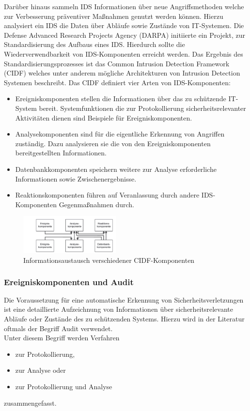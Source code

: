 \documentclass[11pt]{scrartcl}
\begin{document}
Darüber hinaus sammeln IDS Informationen über neue Angriffsmethoden welche zur Verbesserung präventiver Maßnahmen genutzt werden können. Hierzu analysiert ein IDS die Daten über Abläufe sowie Zustände von IT-Systemen. Die Defense Advanced Research Projects Agency (DARPA) initiierte ein Projekt, zur Standardisierung des Aufbaus eines IDS. Hierdurch sollte die Wiederverwendbarkeit von IDS-Komponenten erreicht werden. Das Ergebnis des Standardisierungsprozesses ist das Common Intrusion Detection Framework (CIDF) \cite{7} welches unter anderem mögliche Architekturen von Intrusion Detection Systemen beschreibt. 
Das CIDF definiert vier Arten von IDS-Komponenten:\\
\begin{itemize}
\item Ereigniskomponenten stellen die Informationen über das zu schützende IT-System
bereit. Systemfunktionen die zur Protokollierung sicherheitsrelevanter
Aktivitäten dienen sind Beispiele für Ereigniskomponenten.

\item Analysekomponenten sind für die eigentliche Erkennung von Angriffen zuständig.
Dazu analysieren sie die von den Ereigniskomponenten bereitgestellten
Informationen.

\item Datenbankkomponenten speichern weitere zur Analyse erforderliche Informationen
sowie Zwischenergebnisse.

\item Reaktionskomponenten führen auf Veranlassung durch andere IDS-Komponenten
Gegenmaßnahmen durch.
\end{itemize}

\begin{figure}
\includegraphics[width=0.45\textwidth]{aa3.png}
	\caption{Informationsaustausch verschiedener CIDF-Komponenten \cite{5}}
	\label{fig2}
\end{figure} \noindent
\subsubsection{Ereigniskomponenten und Audit}
\label{sec:ereignis und audit}

Die Voraussetzung für eine automatische Erkennung von Sicherheitsverletzungen
ist eine detaillierte Aufzeichnung von Informationen über sicherheitsrelevante Abläufe
oder Zustände des zu schützenden Systems. Hierzu wird in der Literatur oftmals der Begriff Audit verwendet.\\
Unter diesem Begriff werden Verfahren
\begin{itemize}
\item zur Protokollierung,
\item zur Analyse oder
\item zur Protokollierung und Analyse
\end{itemize}
zusammengefasst.
\end{document}
